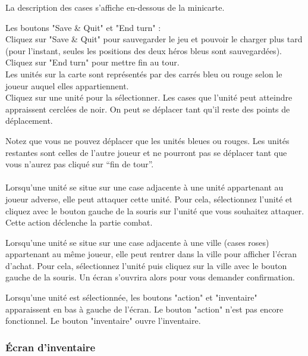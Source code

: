 \documentclass[11pt,a4paper]{article}
\begin{document}
La description des cases s'affiche en-dessous de la minicarte.

Les boutons "Save \& Quit" et "End turn" :\\
Cliquez sur "Save \& Quit" pour sauvegarder le jeu et pouvoir le charger plus tard (pour l'instant, seules les positions des deux héros bleus sont sauvegardées).
Cliquez sur "End turn" pour mettre fin au tour.\\

Les unités sur la carte sont représentés par des carrés bleu ou rouge selon le joueur auquel elles appartiennent. \\
Cliquez sur une unité pour la sélectionner. Les cases que l'unité peut atteindre appraissent cerclées de noir. On peut se déplacer tant qu'il reste des points de déplacement.

Notez que vous ne pouvez déplacer que les unités bleues ou rouges. Les unités restantes sont celles de l'autre joueur et ne pourront pas se déplacer tant que vous n'aurez pas cliqué sur ``fin de tour''. \\
\\

Lorsqu'une unité se situe sur une case adjacente à une unité appartenant au joueur adverse, elle peut attaquer cette unité. Pour cela, sélectionnez l'unité et cliquez avec le bouton gauche de la souris sur l'unité que vous souhaitez attaquer. Cette action déclenche la partie combat.

Lorsqu'une unité se situe sur une case adjacente à une ville (cases roses) appartenant au même joueur, elle peut rentrer dans la ville pour afficher l'écran d'achat. Pour cela, sélectionnez l'unité puis cliquez sur la ville avec le bouton gauche de la souris. Un écran s'ouvrira alors pour vous demander confirmation.

Lorsqu'une unité est sélectionnée, les boutons "action" et "inventaire" apparaissent en bas à gauche de l'écran.
Le bouton "action" n'est pas encore fonctionnel.
Le bouton "inventaire" ouvre l'inventaire.

\clearpage

\subsubsection{Écran d'inventaire}
\end{document}
